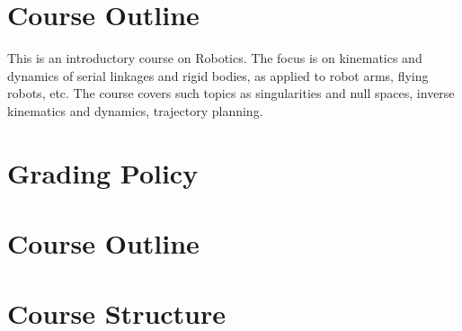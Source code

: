 \documentclass[11pt,a4paper]{article}
\begin{document}
%

\section{Course Outline}
This is an introductory course on Robotics. The focus is on kinematics and dynamics of serial linkages and rigid bodies, as applied to robot arms, flying robots, etc. The course covers such topics as singularities and null spaces, inverse kinematics and dynamics, trajectory planning. 
\section{Grading Policy}


\section{Course Outline}


\section{Course Structure}

\end{document}
